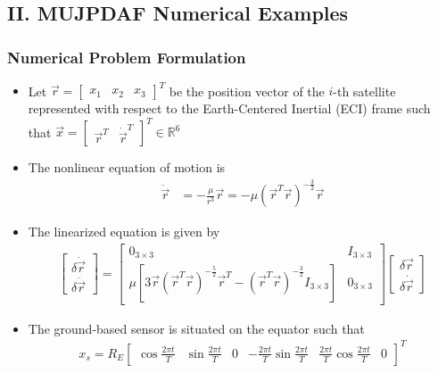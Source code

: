 \documentclass[hyperref={pdftex,pdfpagemode=none,pdfstartview=FitH},10pt]{beamer}
\renewcommand{\Re}{\ensuremath{\mathbb{R}}}
\begin{document}
\section*{}
\subsection*{II. MUJPDAF Numerical Examples}


\begin{frame}
\frametitle{Numerical Problem Formulation}

\begin{itemize}
\item Let $\vec r=\begin{bmatrix}x_1 & x_2 & x_3\end{bmatrix}^T$ be the position vector of the $i$-th satellite represented with respect to the Earth-Centered Inertial (ECI) frame such that $\vec x=\begin{bmatrix}\vec r^T & \dot{\vec r}^T\end{bmatrix}^T\in\Re^6$
\item The nonlinear equation of motion is
\begin{align}
\ddot{\vec r}&=-\frac{\mu}{r^3}\vec r=-\mu(\vec r^T\vec r)^{-\frac32}\vec r
\end{align}
\item The linearized equation is given by
\begin{align}
\begin{bmatrix}
\delta\dot{\vec r} \\ \delta\ddot{\vec r}
\end{bmatrix}
=
\begin{bmatrix}
0_{3\times3} & I_{3\times3} \\
\mu\left[3\vec r({\vec r}^T\vec r)^{-\frac52}{\vec r}^T-({\vec r}^T\vec r)^{-\frac32}I_{3\times3}\right] & 0_{3\times3}
\end{bmatrix}
\begin{bmatrix}
\delta\vec r \\ \delta\dot{\vec r}
\end{bmatrix}
\end{align}
\item The ground-based sensor is situated on the equator such that
\begin{align}
x_s=R_E
\begin{bmatrix}
\cos\frac{2\pi t}T & \sin\frac{2\pi t}T & 0 & -\frac{2\pi t}T\sin\frac{2\pi t}T  & \frac{2\pi t}T\cos\frac{2\pi t}T & 0
\end{bmatrix}^T
\end{align}
\end{itemize}

\end{frame}
\end{document}
